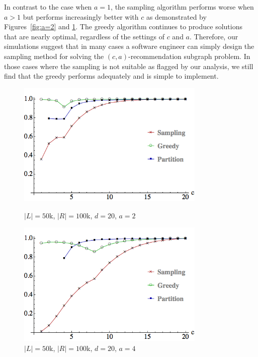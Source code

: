 
\vs
In contrast to the case when $a=1$, the sampling algorithm performs
worse when $a>1$ but performs increasingly better with $c$ as
demonstrated by Figures~\ref{fig:a=2} and \ref{fig:a=4}. The greedy
algorithm continues to produce solutions that are nearly optimal,
regardless of the settings of $c$ and $a$. Therefore, our simulations
suggest that in many cases a software engineer can simply design the
sampling method for solving the $(c, a)$-recommendation subgraph
problem. In those cases where the sampling is not suitable as flagged by our analysis, 
we still find that the greedy performs adequately and is simple to implement.


\begin{figure}[t]
\centering
\begin{minipage}[h]{0.48\textwidth}
\centering
\includegraphics[width=0.8\textwidth]{images/l=50000,r=100000,a=2_Greedy_vs_Naive.png}
\caption{$|L|=50$k, $|R|=100$k, $d=20$, $a=2$}\label{fig:a=2}
\end{minipage}
\hspace{0cm}
\begin{minipage}[h]{0.48\textwidth}
\centering
\includegraphics[width=0.8\textwidth]{images/l=50000,r=100000,a=4_Greedy_vs_Naive.png}
\caption{$|L|=50$k, $|R|=100$k, $d=20$, $a=4$}\label{fig:a=4}
\end{minipage}
\vspace{-0.2in}
\end{figure}

